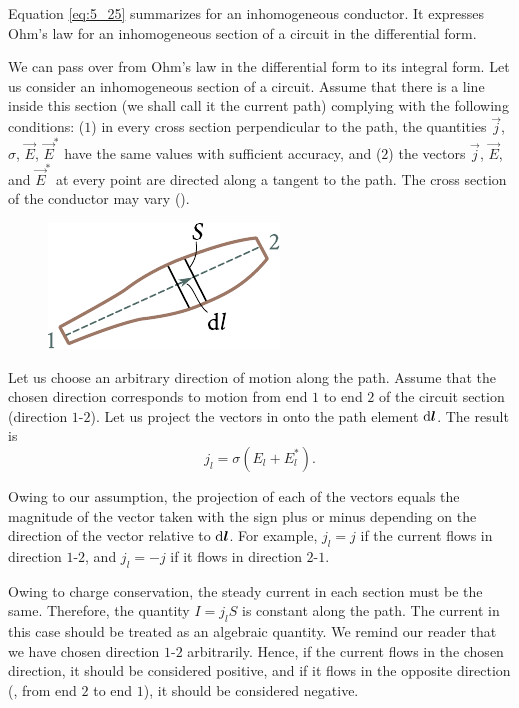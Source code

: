 Equation \eqref{eq:5_25} summarizes  for an inhomogeneous conductor. It expresses Ohm's law for an inhomogeneous section of a circuit in the differential form.

We can pass over from Ohm's law in the differential form to its integral form. Let us consider an inhomogeneous section of a circuit. Assume that there is a line inside this section (we shall call it the current path) complying with the following conditions: ($1$) in every cross section perpendicular to the path, the quantities $\vec{j}$, $\sigma$, $\vec{E}$, $\vec{E}^*$ have the same values
with sufficient accuracy, and ($2$) the vectors $\vec{j}$, $\vec{E}$, and $\vec{E}^*$ at every point are directed along a tangent to the path. The cross section of the conductor may vary ().

\begin{figure}[t]
	\begin{center}
		\includegraphics[scale=1]{figures/ch_05/fig_5_6.pdf}
		\caption[]{}
		\label{fig:5_6}
	\end{center}
	\vspace{-0.8cm}
\end{figure}

Let us choose an arbitrary direction of motion along the path. Assume that the chosen  direction corresponds to motion from end $1$ to end $2$ of the circuit section (direction $1$-$2$). Let us project the vectors in  onto the path element $\mathrm{d}\boldsymbol{l}$. The result is
\begin{equation}\label{eq:5_26}
    j_l = \sigma (E_l + E_l^*).
\end{equation}

\noindent
Owing to our assumption, the projection of each of the vectors equals the magnitude of the vector taken with the sign plus or minus depending on the direction of the vector relative to $\mathrm{d}\boldsymbol{l}$. For example, $j_l=j$ if the current flows in direction $1$-$2$, and $j_l=-j$ if it flows in direction $2$-$1$.

Owing to charge conservation, the steady current in each section must be the same. Therefore, the quantity $I=j_lS$ is constant along the path. The current in this case should be treated as an algebraic quantity. We remind our reader that we have chosen direction $1$-$2$ arbitrarily. Hence, if the current flows in the chosen direction, it should be considered positive, and if it flows in the opposite direction (\ie, from end $2$ to end $1$), it should be considered negative.

